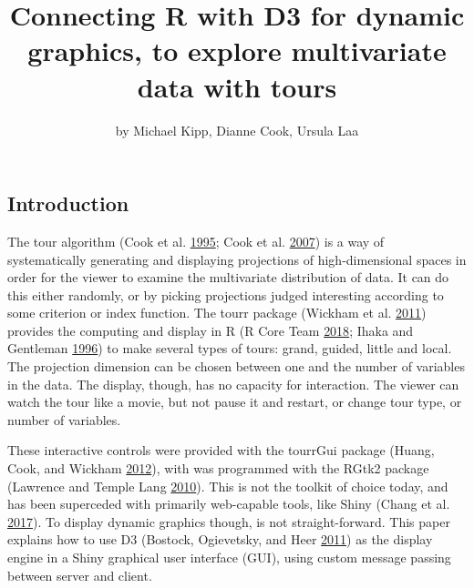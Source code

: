 \title{Connecting R with D3 for dynamic graphics, to explore multivariate data
with tours}
\author{by Michael Kipp, Dianne Cook, Ursula Laa}

\maketitle


\subsection{Introduction}\label{introduction}

The tour algorithm (Cook et al. \protect\hyperlink{ref-gt_pp}{1995};
Cook et al. \protect\hyperlink{ref-gt_pp_mc}{2007}) is a way of
systematically generating and displaying projections of high-dimensional
spaces in order for the viewer to examine the multivariate distribution
of data. It can do this either randomly, or by picking projections
judged interesting according to some criterion or index function. The
tourr package (Wickham et al. \protect\hyperlink{ref-tourr}{2011})
provides the computing and display in R (R Core Team
\protect\hyperlink{ref-R}{2018}; Ihaka and Gentleman
\protect\hyperlink{ref-ihaka:1996}{1996}) to make several types of
tours: grand, guided, little and local. The projection dimension can be
chosen between one and the number of variables in the data. The display,
though, has no capacity for interaction. The viewer can watch the tour
like a movie, but not pause it and restart, or change tour type, or
number of variables.

These interactive controls were provided with the tourrGui package
(Huang, Cook, and Wickham \protect\hyperlink{ref-tourrGui}{2012}), with
was programmed with the RGtk2 package (Lawrence and Temple Lang
\protect\hyperlink{ref-RGtk2}{2010}). This is not the toolkit of choice
today, and has been superceded with primarily web-capable tools, like
Shiny (Chang et al. \protect\hyperlink{ref-shiny}{2017}). To display
dynamic graphics though, is not straight-forward. This paper explains
how to use D3 (Bostock, Ogievetsky, and Heer
\protect\hyperlink{ref-D3}{2011}) as the display engine in a Shiny
graphical user interface (GUI), using custom message passing between
server and client.

